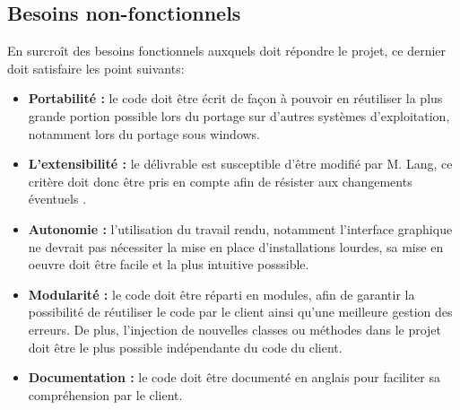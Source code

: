 \subsection{Besoins non-fonctionnels}
En surcroît des besoins fonctionnels auxquels doit répondre le projet, ce dernier doit satisfaire les point suivants:\\
\begin{itemize}
\item \textbf{Portabilité :} le code doit être écrit de façon à pouvoir en réutiliser la plus grande portion possible lors du portage sur d'autres systèmes d'exploitation, notamment lors du portage sous windows.\\ 
\item \textbf{L'extensibilité :} le délivrable est susceptible d'être modifié par M. Lang, ce critère doit donc être pris en compte afin de résister aux changements éventuels .\\
\item \textbf{Autonomie :} l'utilisation du travail rendu, notamment l'interface graphique ne devrait pas nécessiter la mise en place d'installations lourdes, sa mise en oeuvre doit être facile et la plus intuitive posssible.\\
\item \textbf{Modularité :} le code doit être réparti en modules, afin de garantir la possibilité de réutiliser le code par le client ainsi qu'une meilleure gestion des erreurs. De plus, l'injection de nouvelles classes ou méthodes dans le projet doit être le plus possible indépendante du code du client.\\
\item \textbf{Documentation :} le code doit être documenté en anglais pour faciliter sa compréhension par le client.\\

\end{itemize}

